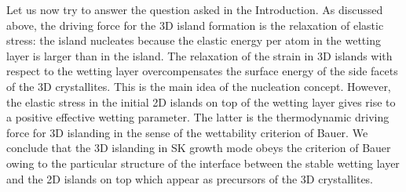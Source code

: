 \documentclass[aps,prl,showpacs,twocolumn,byrevtex,floatfix]{revtex4-1}
\begin{document}
Let us now try to answer the question asked in the Introduction. As discussed
above, the driving force for the 3D island formation is the relaxation of
elastic stress: the island nucleates because the elastic energy per atom in the
wetting layer is larger than in the island. The relaxation of the strain in 3D
islands with respect to the wetting layer overcompensates the surface energy of
the side facets of the 3D crystallites. This is the main idea of the nucleation
concept. However, the elastic stress in the initial 2D islands on top of the
wetting layer gives rise to a positive effective wetting parameter. The latter
is the thermodynamic driving force for 3D islanding in the sense of the
wettability criterion of Bauer. We conclude that the 3D islanding in SK growth
mode obeys the criterion of Bauer owing to the particular structure of the
interface between the stable wetting layer and the 2D islands on top which
appear as precursors of the 3D crystallites.\cite{Frank49,Frank491}
\end{document}
